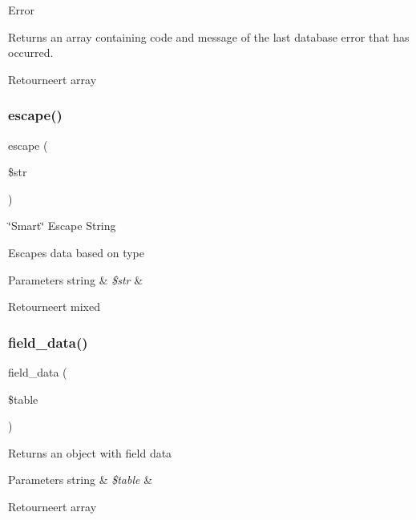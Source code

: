 Error

Returns an array containing code and message of the last database error that has occurred.

\begin{DoxyReturn}{Retourneert}
array 
\end{DoxyReturn}
\mbox{\label{class_c_i___d_b__postgre__driver_ac8f37ca5703d4558c732e692194f8cd6}} 
\subsubsection{\texorpdfstring{escape()}{escape()}}
{\footnotesize\ttfamily escape (\begin{DoxyParamCaption}\item[{}]{\$str }\end{DoxyParamCaption})}

\char`\"{}\+Smart\char`\"{} Escape String

Escapes data based on type


\begin{DoxyParams}[1]{Parameters}
string & {\em \$str} & \\
\hline
\end{DoxyParams}
\begin{DoxyReturn}{Retourneert}
mixed 
\end{DoxyReturn}
\mbox{\label{class_c_i___d_b__postgre__driver_a90355121e1ed009e0efdbd544ab56efa}} 
\subsubsection{\texorpdfstring{field\_data()}{field\_data()}}
{\footnotesize\ttfamily field\+\_\+data (\begin{DoxyParamCaption}\item[{}]{\$table }\end{DoxyParamCaption})}

Returns an object with field data


\begin{DoxyParams}[1]{Parameters}
string & {\em \$table} & \\
\hline
\end{DoxyParams}
\begin{DoxyReturn}{Retourneert}
array 
\end{DoxyReturn}
\mbox{\label{class_c_i___d_b__postgre__driver_a933f2cde8dc7f87875e257d0a4902e99}} 
